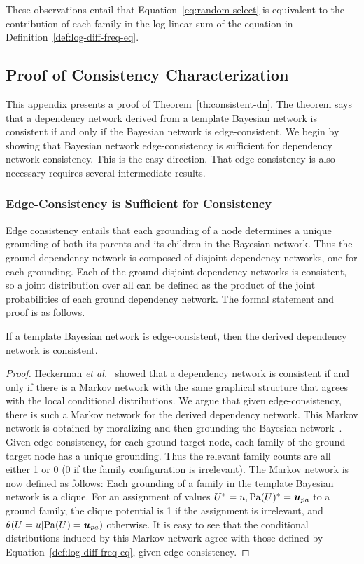 \documentclass[runningheads,a4paper]{llncs}
\begin{document}
These observations entail that Equation~\eqref{eq:random-select} is equivalent to the contribution of each family in the log-linear sum of the equation in Definition~\ref{def:log-diff-freq-eq}.

\subsection{Proof of Consistency Characterization} 
\label{sec:consistency-proof}
This appendix presents a proof of Theorem~\ref{th:consistent-dn}. The theorem says that a dependency network derived from a template Bayesian network is consistent if and only if the Bayesian network is edge-consistent. We begin by showing that Bayesian network edge-consistency is sufficient for dependency network consistency. This is the easy direction. That edge-consistency is also necessary requires several intermediate results.

\subsubsection{Edge-Consistency is Sufficient for Consistency}

Edge consistency entails that each grounding of a node determines a unique grounding of both its parents and its children in the Bayesian network. Thus the ground dependency network is composed of disjoint dependency networks, one for each grounding. Each of the ground disjoint dependency networks is consistent, so a joint distribution over all can be defined as the product of the joint probabilities of each ground dependency network. The formal statement and proof is as follows.

\begin{proposition}
If a template Bayesian network is edge-consistent, then the derived dependency network is consistent.
\end{proposition}

\begin{proof} Heckerman {\em et al.}~\cite{Heckerman2000} showed that a dependency network is consistent if and only if there is a Markov network with the same graphical structure that agrees with the local conditional distributions. We argue that given edge-consistency, there is such a Markov network for the derived dependency network. This Markov network  is obtained by moralizing and then grounding the Bayesian network~\cite{Domingos2009}. Given edge-consistency, for each ground target node, each family of the ground target node has a unique grounding. Thus the relevant family counts are all either 1 or 0 (0 if the family configuration is irrelevant). The Markov network is now defined as follows: Each grounding of a family in the template Bayesian network is a clique. For an assignment of values $\FG{\UT} = \UV,\FG{\Pa{\UT}} = \Prange{\UT}$ to a ground family, the clique potential is 1 if the assignment is irrelevant, and $\cprob{\UT = \UV}{\Pa{\UT} = \Prange{\UT}}$ otherwise. It is easy to see that the conditional distributions induced by this Markov network agree with those defined by Equation~\ref{def:log-diff-freq-eq}, given edge-consistency.
\end{proof}
\end{document}
